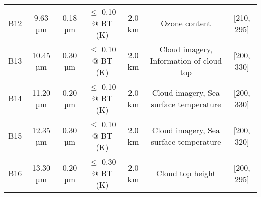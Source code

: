 \begin{table}[!htp]
{\begin{tabular}{ccccccc}
            B12 & 9.63 µm            & 0.18 µm   & $\le$ 0.10 $@$ BT (K)               & 2.0 km     & Ozone content                           & [210, 295] \\
            B13 & 10.45 µm           & 0.30 µm   & $\le$ 0.10 $@$ BT (K)               & 2.0 km     & Cloud imagery, Information of cloud top & [200, 330] \\
            B14 & 11.20 µm           & 0.20 µm   & $\le$ 0.10 $@$ BT (K)               & 2.0 km     & Cloud imagery, Sea surface temperature  & [200, 330] \\
            B15 & 12.35 µm           & 0.30 µm   & $\le$ 0.10 $@$ BT (K)               & 2.0 km     & Cloud imagery, Sea surface temperature  & [200, 320] \\
            B16 & 13.30 µm           & 0.20 µm   & $\le$ 0.30 $@$ BT (K)               & 2.0 km     & Cloud top height                        & [200, 295] \\ \hline
            \end{tabular}
    }
    \label{table:Himawari_infos}
\end{table}
